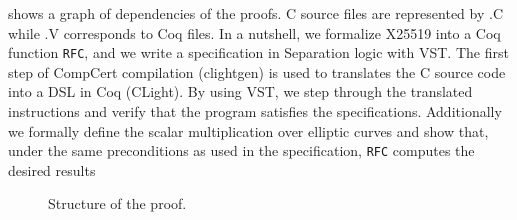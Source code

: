  shows a graph of dependencies of the proofs.
C source files are represented by {\color{doc@lstfunctions}.C} while
  {\color{doc@lstfunctions}.V} corresponds to Coq files.
In a nutshell, we formalize X25519 into a Coq function \texttt{RFC},
and we write a specification in Separation logic with VST.
The first step of CompCert compilation (clightgen) is used to translates
the C source code into a DSL in Coq (CLight). By using VST,
we step through the translated instructions and verify that the program satisfies the specifications.
Additionally we formally define the scalar multiplication over elliptic curves and show that,
under the same preconditions as used in the specification, \texttt{RFC} computes the desired results

\begin{figure}[h]
  \centering
  
  \caption{Structure of the proof.}
  \label{tikz:ProofOverview}
\end{figure}


%
%
